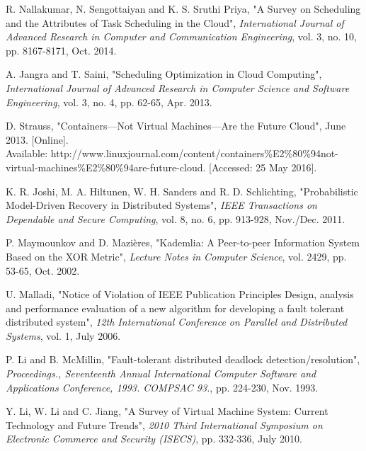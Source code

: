 \documentclass{cslthse-msc}
\begin{document}
\begin{thebibliography}{50}
	R. Nallakumar, N. Sengottaiyan and K. S. Sruthi Priya,
	"A Survey on Scheduling and the Attributes of Task Scheduling in the Cloud",
	\emph{International Journal of Advanced Research in Computer and Communication Engineering}, vol. 3, no. 10, pp. 8167-8171, Oct. 2014.

	A. Jangra and T. Saini,
	"Scheduling Optimization in Cloud Computing",
	\emph{International Journal of Advanced Research in Computer Science and Software Engineering}, vol. 3, no. 4, pp. 62-65, Apr. 2013.

	D. Strauss,
	"Containers—Not Virtual Machines—Are the Future Cloud", 
	June 2013. [Online]. \\
	Available:
	 http://www.linuxjournal.com/content/containers\%E2\%80\%94not-virtual-machines\%E2\%80\%94are-future-cloud.
	[Accessed: 25 May 2016].
	
	K. R. Joshi, M. A. Hiltunen, W. H. Sanders and R. D. Schlichting,
	"Probabilistic Model-Driven Recovery in Distributed Systems",
	\emph{IEEE Transactions on Dependable and Secure Computing}, vol. 8, no. 6, pp. 913-928, Nov./Dec. 2011.
	
	P. Maymounkov and D. Mazières,
	"Kademlia: A Peer-to-peer Information System Based on the XOR Metric",
	\emph{Lecture Notes in Computer Science}, vol. 2429, pp. 53-65, Oct. 2002.

	U. Malladi,
	"Notice of Violation of IEEE Publication Principles Design, analysis and performance evaluation of a new algorithm for developing a fault tolerant distributed system",
	\emph{12th International Conference on Parallel and Distributed Systems}, vol. 1, July 2006. %

	P. Li and B. McMillin,
	"Fault-tolerant distributed deadlock detection/resolution",
	\emph{Proceedings., Seventeenth Annual International Computer Software and Applications Conference, 1993. COMPSAC 93.}, pp. 224-230, Nov. 1993.
	
	Y. Li, W. Li and C. Jiang,
	"A Survey of Virtual Machine System: Current Technology and Future Trends",
	\emph{2010 Third International Symposium on Electronic Commerce and Security (ISECS)}, pp. 332-336,	July 2010.

\end{thebibliography}
\end{document}
